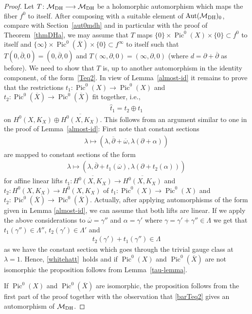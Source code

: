 \documentclass[pdftex]{sigma}
\numberwithin{equation}{section}
\begin{document}
\begin{proof} Let $T \colon {\mathcal M}_{\rm DH} \longrightarrow {\mathcal M}_{\rm DH}$ be a holomorphic automorphism which maps the f\/iber $f^0$ to itself. After composing with a suitable element of $\operatorname{Aut}({\mathcal M}_{\rm DH})_0$, compare with Section~\ref{aut0mdh} and in particular with the proof of Theorem~\ref{thmDHa}, we may assume that $T$ maps $\{0\}\times\operatorname{Pic}^0(X)\times\{0\} \subset f^0$ to itself and $\{\infty\}\times\operatorname{Pic}^0(\overline{X}) \times\{0\} \subset f^\infty$ to itself such that $T(0, \overline{\partial}, 0) = (0, \overline{\partial}, 0)$ and $T(\infty, \partial, 0) = (\infty, \partial, 0)$ (where $d = \partial+\overline{\partial}$ as before). We need to show that $T$ is, up to another automorphism in the identity component, of the form~\eqref{Teq2}. In view of Lemma~\ref{almost-id} it remains to prove that the restrictions $t_1 \colon \operatorname{Pic}^0(X) \longrightarrow \operatorname{Pic}^0(X)$ and $t_2 \colon \operatorname{Pic}^0(\overline{X}) \longrightarrow \operatorname{Pic}^0(\overline{X})$ f\/it together, i.e.,
\begin{gather}\label{whitehatt}\widehat{t}_1 = t_2\oplus t_1\end{gather}
on $H^0(X, K_X)\oplus \overline{H^0(X, K_X)}$. This follows from an argument similar to one in the proof of Lemma~\ref{almost-id}: First note that constant sections
\begin{gather*}\lambda \longmapsto (\lambda, \overline{\partial}+\overline{\omega},
\lambda(\partial+\alpha))\end{gather*}
are mapped to constant sections of the form
\begin{gather*}\lambda \longmapsto (\lambda, \overline{\partial}+t_1(\overline{\omega}), \lambda(\partial+t_2(\alpha)))\end{gather*}
for af\/f\/ine linear lifts $t_1 \colon \overline{H^0(X, K_X)}  \longrightarrow \overline{H^0(X, K_X)}$ and $t_2 \colon H^0(X, K_X) \longrightarrow H^0(X, K_X)$ of $t_1 \colon \operatorname{Pic}^0(X) \longrightarrow \operatorname{Pic}^0(X)$ and $t_2 \colon \operatorname{Pic}^0(\overline{X}) \longrightarrow \operatorname{Pic}^0(\overline{X})$. Actually, after applying automorphisms of the form given in Lemma \ref{almost-id}, we can assume that both lifts are linear. If we apply the above considerations to $\overline{\omega}=\gamma''$ and $\alpha=\gamma'$ where $\gamma=\gamma'+\gamma''\in\Lambda$ we get that $t_1(\gamma'')\in\Lambda''$, $t_2(\gamma')\in\Lambda'$ and
 \begin{gather*}t_2(\gamma')+t_1(\gamma'')\in\Lambda\end{gather*}
as  we have the constant section which goes through the trivial gauge class at $\lambda=1$. Hence, \eqref{whitehatt}~holds and if $\operatorname{Pic}^0(X)$ and $\operatorname{Pic}^0(\overline{X})$ are not isomorphic the proposition follows from Lem\-ma~\ref{tau-lemma}.

If $\operatorname{Pic}^0(X)$ and $\operatorname{Pic}^0(\overline{X})$ are isomorphic, the proposition follows from the f\/irst part of the proof together with the observation that \eqref{barTeq2} gives an automorphism of ${\mathcal M}_{\rm DH}$.
\end{proof}
\end{document}
